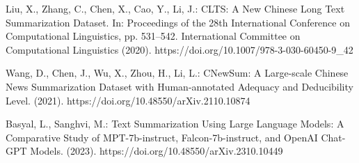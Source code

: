 \documentclass[preprint,12pt]{elsarticle}
\begin{document}
\begin{thebibliography}{11}
  Liu, X., Zhang, C., Chen, X., Cao, Y., Li, J.:
  CLTS: A New Chinese Long Text Summarization Dataset.
  In: Proceedings of the 28th International Conference on Computational Linguistics, pp. 531–542. International Committee on Computational Linguistics (2020).
  https://doi.org/10.1007/978-3-030-60450-9\_42

  Wang, D., Chen, J., Wu, X., Zhou, H., Li, L.:
  CNewSum: A Large-scale Chinese News Summarization Dataset with Human-annotated Adequacy and Deducibility Level. (2021).
  https://doi.org/10.48550/arXiv.2110.10874

  Basyal, L., Sanghvi, M.:
  Text Summarization Using Large Language Models: A Comparative Study of MPT-7b-instruct, Falcon-7b-instruct, and OpenAI Chat-GPT Models. (2023).
  https://doi.org/10.48550/arXiv.2310.10449

\end{thebibliography}
\end{document}
